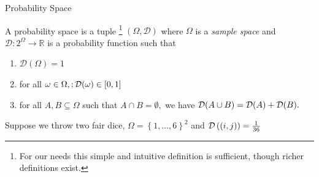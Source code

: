 \documentclass[11pt, usenames, dvipsnames]{beamer}
\begin{document}
\begin{frame}{Probability Space}

\begin{definition}
A probability space is a tuple \footnote{For our needs this simple and intuitive definition is sufficient, though richer definitions exist.} $(\Omega, \mathcal{D})$ where $\Omega$ is a \emph{sample space} and $\mathcal{D}:2^{\Omega}\rightarrow\mathbb{R}$ is a probability function such that 

\begin{enumerate}
\item $\mathcal{D}(\Omega)=1$
\item for all $\omega\in\Omega,;\mathcal{D}(\omega)\in[0,1]$
\item for all $A,B\subseteq\Omega$ such that $A\cap B=\emptyset,$ we have $\mathcal{D}(A \cup B)=\mathcal{D}(A)+\mathcal{D}(B).$
\end{enumerate}
\end{definition} 
\pause
\begin{example}
Suppose we throw two fair dice, $\Omega=\left\{ 1,\dots,6\right\} ^{2}$ and $\mathcal{D}\left(\left(i,j\right)\right)=\frac{1}{36}$
\end{example}

\end{frame}
\end{document}
